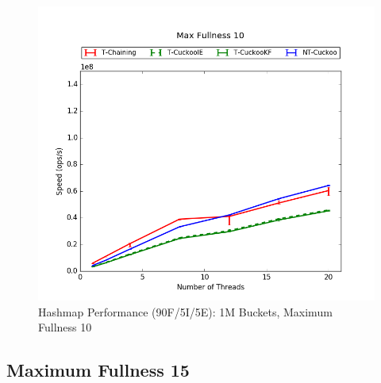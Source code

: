 \begin{figure}[H]
    \centering
	\begin{minipage}{0.5\textwidth}\includegraphics[width=\textwidth]{maps/10HM1M:F90,I5,E5.png} 
    \end{minipage}
	\begin{minipage}{0.4\textwidth}
    
    \end{minipage}
    \caption{Hashmap Performance (90F/5I/5E): 1M Buckets, Maximum Fullness 10}
\end{figure}

\subsection{Maximum Fullness 15}

